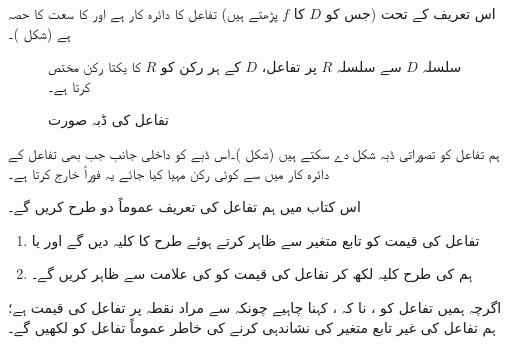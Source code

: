 اس تعریف کے تحت  (جس کو $D$ کا $f$ پڑھتے ہیں) تفاعل  کا دائرہ کار ہے اور  کا سعت  کا حصہ ہے (شکل )۔
\begin{figure}
\centering
\begin{minipage}{0.45\textwidth}
\centering
{}
\caption{سلسلہ $D$ سے سلسلہ $R$ پر تفاعل، $D$ کے ہر رکن کو $R$ کا یکتا رکن مختص کرتا ہے۔}
\label{شکل_ابتدا_تفاعل_دائرہ_کار_اور_سعت}
\end{minipage}\hfill
\begin{minipage}{0.45\textwidth}
\centering
{}
\caption{تفاعل کی ڈبہ صورت}
\label{شکل_ابتدا_تفاعل_ڈبہ}
\end{minipage}%
\end{figure}

ہم تفاعل کو تصوراتی ڈبہ شکل دے سکتے ہیں (شکل )۔اس ڈبے کو داخلی جانب جب بھی تفاعل کے دائرہ کار میں سے کوئی رکن مہیا کیا جائے یہ فوراً  خارج کرتا ہے۔

اس کتاب میں ہم تفاعل کی تعریف عموماً دو طرح کریں گے۔
\begin{enumerate}[1.]
\item
تفاعل کی قیمت کو تابع متغیر  سے ظاہر کرتے ہوئے   طرح کا کلیہ دیں گے اور یا
\item
ہم  کی طرح کلیہ لکھ کر تفاعل کی قیمت کو  کی علامت سے ظاہر کریں گے۔
\end{enumerate}

اگرچہ ہمیں تفاعل کو ، نا کہ ، کہنا چاہیے چونکہ  سے مراد نقطہ  پر تفاعل کی قیمت ہے؛ ہم تفاعل کی غیر تابع متغیر کی نشاندہی کرنے کی خاطر عموماً تفاعل کو   لکھیں گے۔

